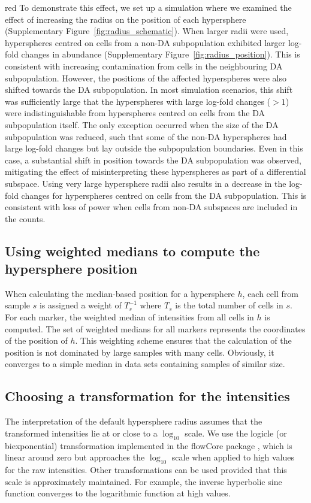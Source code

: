 \documentclass{article}
\begin{document}
\begin{color}{red}
To demonstrate this effect, we set up a simulation where we examined the effect of increasing the radius on the position of each hypersphere (Supplementary Figure~\ref{fig:radius_schematic}).
When larger radii were used, hyperspheres centred on cells from a non-DA subpopulation exhibited larger log-fold changes in abundance (Supplementary Figure~\ref{fig:radius_position}).
This is consistent with increasing contamination from cells in the neighbouring DA subpopulation.
However, the positions of the affected hyperspheres were also shifted towards the DA subpopulation.
In most simulation scenarios, this shift was sufficiently large that the hyperspheres with large log-fold changes ($>1$) were indistinguishable from hyperspheres centred on cells from the DA subpopulation itself.
The only exception occurred when the size of the DA subpopulation was reduced, such that some of the non-DA hyperspheres had large log-fold changes but lay outside the subpopulation boundaries.
Even in this case, a substantial shift in position towards the DA subpopulation was observed, mitigating the effect of misinterpreting these hyperspheres as part of a differential subspace.
Using very large hypersphere radii also results in a decrease in the log-fold changes for hyperspheres centred on cells from the DA subpopulation.
This is consistent with loss of power when cells from non-DA subspaces are included in the counts.

\subsection{Using weighted medians to compute the hypersphere position}
When calculating the median-based position for a hypersphere $h$, each cell from sample $s$ is assigned a weight of $T_s^{-1}$ where $T_s$ is the total number of cells in $s$.
For each marker, the weighted median of intensities from all cells in $h$ is computed.
The set of weighted medians for all markers represents the coordinates of the position of $h$.
This weighting scheme ensures that the calculation of the position is not dominated by large samples with many cells.
Obviously, it converges to a simple median in data sets containing samples of similar size.

\subsection{Choosing a transformation for the intensities}
The interpretation of the default hypersphere radius assumes that the transformed intensities lie at or close to a $\log_{10}$ scale.
We use the logicle (or biexponential) transformation \cite{parks2006new} implemented in the flowCore package \cite{hahne2009flowcore}, which is linear around zero but approaches the $\log_{10}$ scale when applied to high values for the raw intensities.
Other transformations can be used provided that this scale is approximately maintained.
For example, the inverse hyperbolic sine function converges to the logarithmic function at high values.


\end{color}
\end{document}
